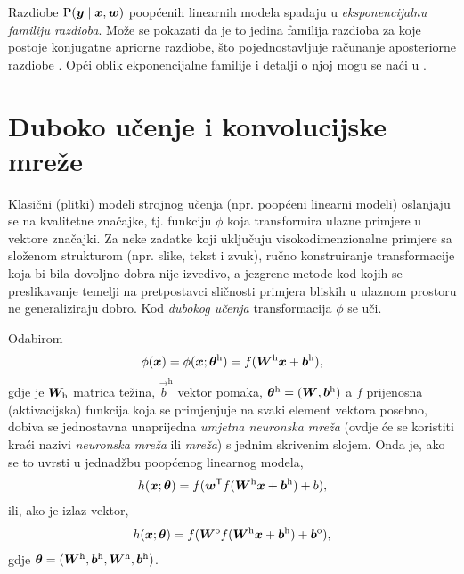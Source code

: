 \documentclass[utf8, diplomski, lmodern]{fer}
\begin{document}
Razdiobe $\P(\vec y\mid\vec x,\vec w)$ poopćenih linearnih modela spadaju u \emph{eksponencijalnu familiju razdioba}. Može se pokazati da je to jedina familija razdioba za koje postoje konjugatne apriorne razdiobe, što pojednostavljuje računanje aposteriorne razdiobe \citet{Murphy:2012:MLPP}. Opći oblik ekponencijalne familije i detalji o njoj mogu se naći u \citet{Murphy:2012:MLPP}.











\chapter{Duboko učenje i konvolucijske mreže} \label{chap:dukm}

Klasični (plitki) modeli strojnog učenja (npr. poopćeni linearni modeli) oslanjaju se na kvalitetne značajke, tj. funkciju $\phi$ koja transformira ulazne primjere u vektore značajki. Za neke zadatke koji uključuju visokodimenzionalne primjere sa složenom strukturom (npr. slike, tekst i zvuk), ručno konstruiranje transformacije koja bi bila dovoljno dobra nije izvedivo, a jezgrene metode kod kojih se preslikavanje temelji na pretpostavci sličnosti primjera bliskih u ulaznom prostoru ne generaliziraju dobro. Kod \emph{dubokog učenja} \citep{LeCun:2015:DL,Goodfellow:2016:DL} transformacija $\phi$ se uči.

Odabirom 
\begin{align}
\phi(\vec x) 
= \phi(\vec x;\mat \theta^\text{h})
= f(\mat W^\text{h}\vec x + \vec b^\text{h}) \text{,}
\end{align}
gdje je $\mat W_\text{h}$ matrica težina, $\vec b^\text{h}$ vektor pomaka, $\vec\theta^\text{h}=(\mat W,\vec b^\text{h})$ a $f$ prijenosna (aktivacijska) funkcija koja se primjenjuje na svaki element vektora posebno, dobiva se jednostavna unaprijedna \emph{umjetna neuronska mreža} (ovdje će se koristiti kraći nazivi \textit{neuronska mreža} ili \textit{mreža}) s jednim skrivenim slojem. Onda je, ako se to uvrsti u jednadžbu poopćenog linearnog modela,
\begin{align}
h(\vec x; \vec{\theta}) 
= f(\vec w^\tp f(\mat W^\text{h}\vec x + \vec b^\text{h})+b) \text{,}
\end{align}
ili, ako je izlaz vektor,
\begin{align}
h(\vec x; \vec{\theta}) 
= f(\mat W^\text{o} f(\mat W^\text{h}\vec x + \vec b^\text{h})+\vec b^\text{o}) \text{,}
\end{align}
gdje $\vec\theta=(\mat W^\text{h},\vec b^\text{h}, \mat W^\text{h},\vec b^\text{h})$.
\end{document}
